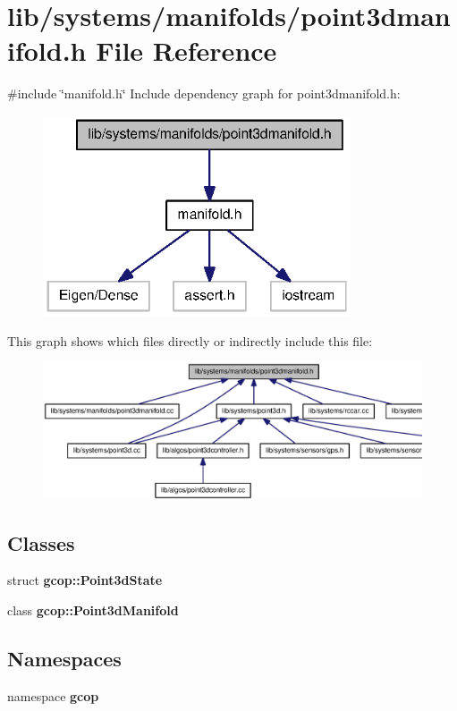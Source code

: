 \section{lib/systems/manifolds/point3dmanifold.h \-File \-Reference}
\label{point3dmanifold_8h}
{\ttfamily \#include \char`\"{}manifold.\-h\char`\"{}}\*
\-Include dependency graph for point3dmanifold.\-h\-:
\nopagebreak
\begin{figure}[H]
\begin{center}
\leavevmode
\includegraphics[width=258pt]{point3dmanifold_8h__incl}
\end{center}
\end{figure}
\-This graph shows which files directly or indirectly include this file\-:
\nopagebreak
\begin{figure}[H]
\begin{center}
\leavevmode
\includegraphics[width=350pt]{point3dmanifold_8h__dep__incl}
\end{center}
\end{figure}
\subsection*{\-Classes}
\begin{DoxyCompactItemize}
\item 
struct {\bf gcop\-::\-Point3d\-State}
\item 
class {\bf gcop\-::\-Point3d\-Manifold}
\end{DoxyCompactItemize}
\subsection*{\-Namespaces}
\begin{DoxyCompactItemize}
\item 
namespace {\bf gcop}
\end{DoxyCompactItemize}
